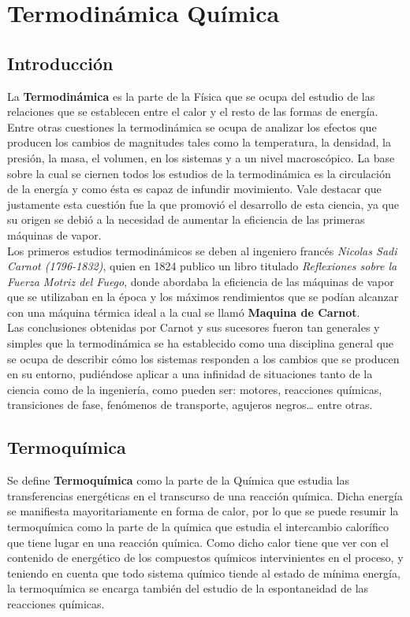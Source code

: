 \chapter{Termodinámica Química}

\section{Introducción}

La \textbf{Termodinámica} es la parte de la Física que se ocupa del estudio de las relaciones que se establecen entre el calor y el resto de las formas de energía. Entre otras cuestiones la termodinámica se ocupa de analizar los efectos que producen los cambios de magnitudes tales como la temperatura, la densidad, la presión, la masa, el volumen, en los sistemas y a un nivel macroscópico. La base sobre la cual se ciernen todos los estudios de la termodinámica es la circulación de la energía y como ésta es capaz de infundir movimiento. Vale destacar que justamente esta cuestión fue la que promovió el desarrollo de esta ciencia, ya que su origen se debió a la necesidad de aumentar la eficiencia de las primeras máquinas de vapor.\\

Los primeros estudios termodinámicos se deben al ingeniero francés \emph{Nicolas Sadi Carnot (1796-1832)}, quien en 1824 publico un libro titulado \emph{Reflexiones sobre la Fuerza Motriz del Fuego}, donde abordaba la eficiencia de las máquinas de vapor que se utilizaban en la época y los máximos rendimientos que se podían alcanzar con una máquina térmica ideal a la cual se llamó \textbf{Maquina de Carnot}.\\

Las conclusiones obtenidas por Carnot y sus sucesores fueron tan generales y simples que la termodinámica se ha establecido como una disciplina general que se ocupa de describir cómo los sistemas responden a los cambios que se producen en su entorno, pudiéndose aplicar a una infinidad de situaciones tanto de la ciencia como de la ingeniería, como pueden ser: motores, reacciones químicas, transiciones de fase, fenómenos de transporte, agujeros negros… entre otras. 

\section{Termoquímica}

Se define \textbf{Termoquímica} como la parte de la Química que estudia las transferencias energéticas en el transcurso de una reacción química. Dicha energía se manifiesta mayoritariamente en forma de calor, por lo que se puede resumir la termoquímica como la parte de la química que estudia el intercambio calorífico que tiene lugar en una reacción química. Como dicho calor tiene que ver con el contenido de energético de los compuestos químicos intervinientes en el proceso, y teniendo en cuenta que todo sistema químico tiende al estado de mínima energía, la termoquímica se encarga también del estudio de la espontaneidad de las reacciones químicas. 


